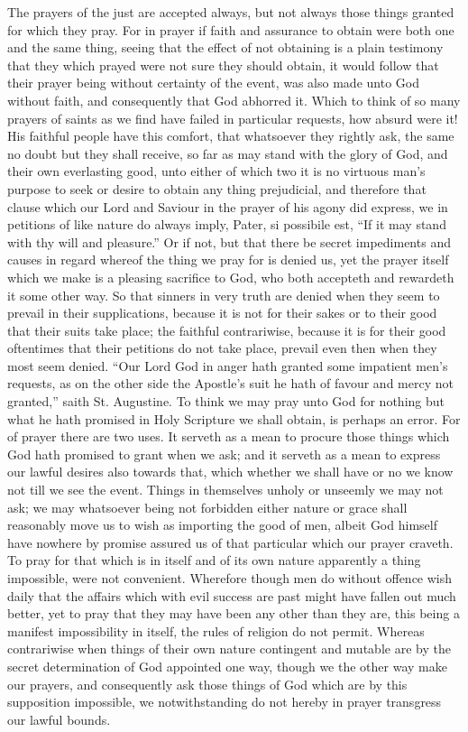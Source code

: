 The prayers of the just are accepted always, but not always those things granted for which they pray. For in prayer if faith and assurance to obtain were both one and the same thing, seeing that the effect of not obtaining is a plain testimony that they which prayed were not sure they should  obtain, it would follow that their prayer being without certainty of the event, was also made unto God without faith, and consequently that God abhorred it. Which to think of so many prayers of saints as we find have failed in particular requests, how absurd were it! His faithful people have this comfort, that whatsoever they rightly ask, the same no doubt but they shall receive, so far as may stand with the glory of God, and their own everlasting good, unto either of which two it is no virtuous man’s purpose to seek or desire to obtain any thing prejudicial, and therefore that clause which our Lord and Saviour in the prayer of his agony did express, we in petitions of like nature do always imply, Pater, si possibile est, “If it may stand with thy will and pleasure.” Or if not, but that there be secret impediments and causes in regard whereof the thing we pray for is denied us, yet the prayer itself which we make is a pleasing sacrifice to God, who both accepteth and rewardeth it some other way. So that sinners in very truth are denied when they seem to prevail in their supplications, because it is not for their sakes or to their good that their suits take place; the faithful contrariwise, because it is for their good oftentimes that their petitions do not take place, prevail even then when they most seem denied. “Our Lord God in anger hath granted some impatient men’s requests, as on the other side the Apostle’s suit he hath of favour and mercy not granted,” saith St. Augustine.
To think we may pray unto God for nothing but what he hath promised in Holy Scripture we shall obtain, is perhaps an error. For of prayer there are two uses. It serveth as a mean to procure those things which God hath promised to grant when we ask; and it serveth as a mean to express our lawful desires also towards that, which whether we shall have or no we know not till we see the event. Things in themselves unholy or unseemly we may not ask; we may whatsoever being not forbidden either nature or grace shall reasonably move us to wish as importing the good of men, albeit God himself have nowhere by promise  assured us of that particular which our prayer craveth. To pray for that which is in itself and of its own nature apparently a thing impossible, were not convenient. Wherefore though men do without offence wish daily that the affairs which with evil success are past might have fallen out much better, yet to pray that they may have been any other than they are, this being a manifest impossibility in itself, the rules of religion do not permit. Whereas contrariwise when things of their own nature contingent and mutable are by the secret determination of God appointed one way, though we the other way make our prayers, and consequently ask those things of God which are by this supposition impossible, we notwithstanding do not hereby in prayer transgress our lawful bounds.
